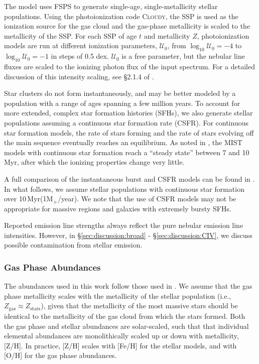 \documentclass[preprint2]{aastex62}
\newcommand{\FSPS}{{\sc FSPS}\xspace}
\newcommand{\Cloudy}{\textsc{Cloudy}\xspace}
\newcommand{\hii}{\ion{H}{2}}
\newcommand\Msun{\ensuremath{\mathrm{M_{\sun}}}\xspace}
\newcommand{\Myr}{$\,$Myr\xspace}
\newcommand{\logten}{\ensuremath{\log_{10}}}
\newcommand{\U}{\ensuremath{\mathcal{U}_{0}}\xspace}
\newcommand{\logUeq}[1]{\ensuremath{\logten \mathcal{U}_0 = #1}}
\begin{document}
The model uses \FSPS to generate single-age, single-metallicity stellar populations. Using the photoionization code \Cloudy, the SSP is used as the ionization source for the gas cloud and the gas-phase metallicity is scaled to the metallicity of the SSP. For each SSP of age $t$ and metallicity $Z$, photoionization models are run at different ionization parameters, \U, from \logUeq{-4} to \logUeq{-1} in steps of 0.5 dex. \U is a free parameter, but the nebular line fluxes are scaled to the ionizing photon flux of the input spectrum. For a detailed discussion of this intensity scaling, see \S 2.1.4 of \citep{Byler+2017}.

Star clusters do not form instantaneously, and may be better modeled by a population with a range of ages spanning a few million years. To account for more extended, complex star formation histories (SFHs), we also generate stellar populations assuming a continuous star formation rate (CSFR). For continuous star formation models, the rate of stars forming and the rate of stars evolving off the main sequence eventually reaches an equilibrium. As noted in , the MIST models with continuous star formation reach a ``steady state'' between 7 and 10\Myr, after which the ionizing properties change very little.

A full comparison of the instantaneous burst and CSFR models can be found in . In what follows, we assume stellar populations with continuous star formation over 10\Myr (1\Msun{}/year). We note that the use of CSFR models may not be appropriate for massive \hii{} regions and galaxies with extremely bursty SFHs. 

Reported emission line strengths always reflect the pure nebular emission line intensities. However, in \S\ref{sec:discussion:broad} - \S\ref{sec:discussion:CIV}, we discuss possible contamination from stellar emission.

\subsubsection{Gas Phase Abundances}\label{sec:model:neb:z}

The abundances used in this work follow those used in . We assume that the gas phase metallicity scales with the metallicity of the stellar population (i.e., $Z_{\mathrm{gas}} \approx Z_{\mathrm{stars}}$), given that the metallicity of the most massive stars should be identical to the metallicity of the gas cloud from which the stars formed. Both the gas phase and stellar abundances are solar-scaled, such that that individual elemental abundances are monolithically scaled up or down with metallicity, [Z/H]. In practice, [Z/H] scales with [Fe/H] for the stellar models, and with [O/H] for the gas phase abundances. 
\end{document}
